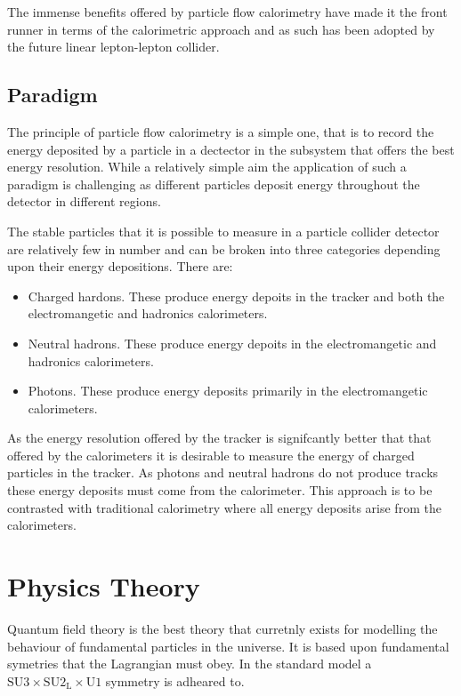 The immense benefits offered by particle flow calorimetry have made it the front runner in terms of the calorimetric approach and as such has been adopted by the future linear lepton-lepton collider.  

\subsection{Paradigm}

The principle of particle flow calorimetry is a simple one, that is to record the energy deposited by a particle in a dectector in the subsystem that offers the best energy resolution.  While a relatively simple aim the application of such a paradigm is challenging as different particles deposit energy throughout the detector in different regions.  

The stable particles that it is possible to measure in a particle collider detector are relatively few in number and can be broken into three categories depending upon their energy depositions.  There are:

\begin{itemize}
\item Charged hardons.  These produce energy depoits in the tracker and both the electromangetic and hadronics calorimeters.
\item Neutral hadrons.  These produce energy depoits in the electromangetic and hadronics calorimeters.
\item Photons.  These produce energy deposits primarily in the electromangetic calorimeters. 
\end{itemize}

As the energy resolution offered by the tracker is signifcantly better that that offered by the calorimeters it is desirable to measure the energy of charged particles in the tracker.  As photons and neutral hadrons do not produce tracks these energy deposits must come from the calorimeter.  This approach is to be contrasted with traditional calorimetry where all energy deposits arise from the calorimeters.  


\section{Physics Theory}

Quantum field theory is the best theory that curretnly exists for modelling the behaviour of fundamental particles in the universe.  It is based upon fundamental symetries that the Lagrangian must obey.  In the standard model a $\text{SU}3 \times \text{SU}2_{\text{L}} \times \text{U}1$ symmetry is adheared to.  

